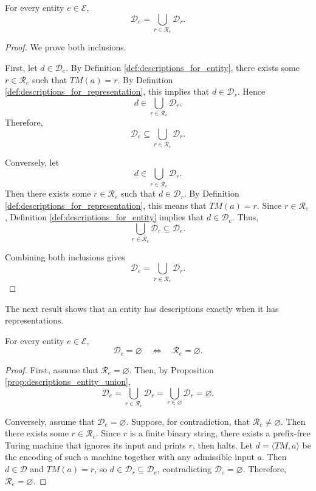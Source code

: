 \begin{proposition}
\label{prop:descriptions_entity_union}
For every entity $e \in \mathcal{E}$,
\[
\mathcal{D}_e=\bigcup_{r\in \mathcal{R}_e}\mathcal{D}_r.
\]
\end{proposition}

\begin{proof}
We prove both inclusions.

First, let $d \in \mathcal{D}_e$. By Definition \ref{def:descriptions_for_entity}, there exists some $r \in \mathcal{R}_e$ such that $TM(a)=r$. By Definition \ref{def:descriptions_for_representation}, this implies that $d \in \mathcal{D}_r$. Hence
\[
d \in \bigcup_{r\in \mathcal{R}_e}\mathcal{D}_r.
\]
Therefore,
\[
\mathcal{D}_e \subseteq \bigcup_{r\in \mathcal{R}_e}\mathcal{D}_r.
\]

Conversely, let
\[
d \in \bigcup_{r\in \mathcal{R}_e}\mathcal{D}_r.
\]
Then there exists some $r \in \mathcal{R}_e$ such that $d \in \mathcal{D}_r$. By Definition \ref{def:descriptions_for_representation}, this means that $TM(a)=r$. Since $r \in \mathcal{R}_e$, Definition \ref{def:descriptions_for_entity} implies that $d \in \mathcal{D}_e$. Thus,
\[
\bigcup_{r\in \mathcal{R}_e}\mathcal{D}_r \subseteq \mathcal{D}_e.
\]

Combining both inclusions gives
\[
\mathcal{D}_e=\bigcup_{r\in \mathcal{R}_e}\mathcal{D}_r.
\]
\end{proof}

The next result shows that an entity has descriptions exactly when it has representations.

\begin{proposition}
\label{prop:descriptions_entity_empty_iff_repr_empty}
For every entity $e \in \mathcal{E}$,
\[
\mathcal{D}_e=\varnothing
\quad\Longleftrightarrow\quad
\mathcal{R}_e=\varnothing.
\]
\end{proposition}

\begin{proof}
First, assume that $\mathcal{R}_e=\varnothing$. Then, by Proposition \ref{prop:descriptions_entity_union},
\[
\mathcal{D}_e=\bigcup_{r\in \mathcal{R}_e}\mathcal{D}_r=\bigcup_{r\in \varnothing}\mathcal{D}_r=\varnothing.
\]

Conversely, assume that $\mathcal{D}_e=\varnothing$. Suppose, for contradiction, that $\mathcal{R}_e\neq\varnothing$. Then there exists some $r\in \mathcal{R}_e$. Since $r$ is a finite binary string, there exists a prefix-free Turing machine that ignores its input and prints $r$, then halts. Let $d=\langle TM,a\rangle$ be the encoding of such a machine together with any admissible input $a$. Then $d\in\mathcal{D}$ and $TM(a)=r$, so $d\in\mathcal{D}_r\subseteq\mathcal{D}_e$, contradicting $\mathcal{D}_e=\varnothing$. Therefore, $\mathcal{R}_e=\varnothing$.
\end{proof}

